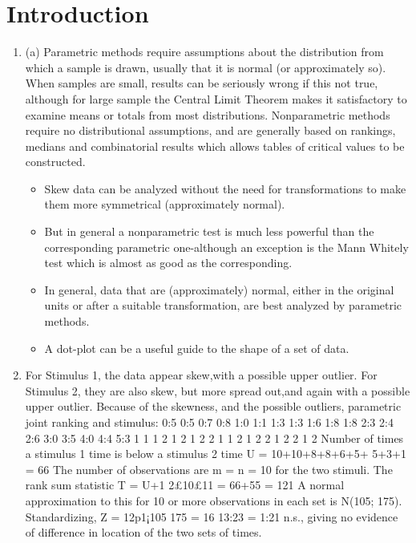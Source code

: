 \documentclass[a4paper,12pt]{article}
\begin{document}
\maketitle

\section{Introduction}
\begin{enumerate}
    \item (a) Parametric methods require assumptions about the distribution from which a sample is
drawn, usually that it is normal (or approximately so). When samples are small, results
can be seriously wrong if this not true, although for large sample the Central Limit
Theorem makes it satisfactory to examine means or totals from most distributions.
Nonparametric methods require no distributional assumptions, and are generally based
on rankings, medians and combinatorial results which allows tables of critical values to be constructed.
\begin{itemize}
    \item  Skew data can be analyzed without the need for transformations to make
them more symmetrical (approximately normal). 
\item But in general a nonparametric test is
much less powerful than the corresponding parametric one-although an exception is the
Mann Whitely test which is almost as good as the corresponding.
\item In general, data that are (approximately) normal, either in the original units or after a
suitable transformation, are best analyzed by parametric methods. 
\item A dot-plot can be a
useful guide to the shape of a set of data.
\end{itemize}

\item For Stimulus 1, the data appear skew,with a possible upper outlier. For Stimulus 2, they
are also skew, but more spread out,and again with a possible upper outlier.
Because of the skewness, and the possible outliers, parametric joint ranking and stimulus:
0:5 0:5 0:7 0:8 1:0 1:1 1:3 1:3 1:6 1:8 1:8 2:3 2:4 2:6 3:0 3:5 4:0 4:4 5:3
1 1 1 2 1 2 1 2 2 1 1 2 1 2 2 1 2 2 1 2
Number of times a stimulus 1 time is below a stimulus 2 time U = 10+10+8+8+6+5+
5+3+1 = 66 The number of observations are m = n = 10 for the two stimuli. The rank
sum statistic T = U+1
2£10£11 = 66+55 = 121 A normal approximation to this for 10 or
more observations in each set is N(105; 175). Standardizing, Z = 12p1¡105
175
= 16
13:23 = 1:21
n.s., giving no evidence of difference in location of the two sets of times.

\end{enumerate}
\end{document}
